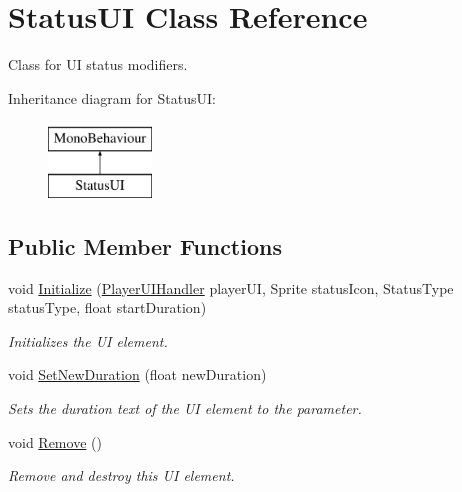 \hypertarget{class_status_u_i}{}\section{Status\+UI Class Reference}
\label{class_status_u_i}


Class for UI status modifiers.  


Inheritance diagram for Status\+UI\+:\begin{figure}[H]
\begin{center}
\leavevmode
\includegraphics[height=2.000000cm]{class_status_u_i}
\end{center}
\end{figure}
\subsection*{Public Member Functions}
\begin{DoxyCompactItemize}
\item 
void \hyperlink{class_status_u_i_abb72528e52d4f970451487847ea1e581}{Initialize} (\hyperlink{class_player_u_i_handler}{Player\+U\+I\+Handler} player\+UI, Sprite status\+Icon, Status\+Type status\+Type, float start\+Duration)
\begin{DoxyCompactList}\small\item\em Initializes the UI element. \end{DoxyCompactList}\item 
void \hyperlink{class_status_u_i_adf9b9b8864c7d6e89adac5d3e290a0d5}{Set\+New\+Duration} (float new\+Duration)
\begin{DoxyCompactList}\small\item\em Sets the duration text of the UI element to the parameter. \end{DoxyCompactList}\item 
void \hyperlink{class_status_u_i_a33bea2be309ac25a8bea7fa4f81ed768}{Remove} ()
\begin{DoxyCompactList}\small\item\em Remove and destroy this UI element. \end{DoxyCompactList}\end{DoxyCompactItemize}
